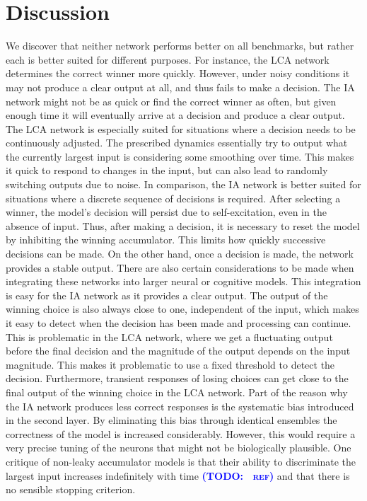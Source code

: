 \documentclass[10pt,letterpaper]{article}
\makeatletter
\newcommand{\todo}[1]{\textbf{\textsc{\textcolor{blue}{(TODO\@: #1)}}}}
\makeatother
\begin{document}
\section{Discussion}
We discover that neither network performs better on all benchmarks, but rather each is better suited for different purposes.
For instance, the LCA network determines the correct winner more quickly.
However, under noisy conditions it may not produce a clear output at all, and thus fails to make a decision.
The IA network might not be as quick or find the correct winner as often, but given enough time it will eventually arrive at a decision and produce a clear output.
The LCA network is especially suited for situations where a decision needs to be continuously adjusted.
The prescribed dynamics essentially try to output what the currently largest input is considering some smoothing over time.
This makes it quick to respond to changes in the input, but can also lead to randomly switching outputs due to noise.
In comparison, the IA network is better suited for situations where a discrete sequence of decisions is required.
After selecting a winner, the model's decision will persist due to self-excitation, even in the absence of input.
Thus, after making a decision, it is necessary to reset the model by inhibiting the winning accumulator.
This limits how quickly successive decisions can be made.
On the other hand, once a decision is made, the network provides a stable output.
There are also certain considerations to be made when integrating these networks into larger neural or cognitive models.
This integration is easy for the IA network as it provides a clear output.
The output of the winning choice is also always close to one, independent of the input, which makes it easy to detect when the decision has been made and processing can continue.
This is problematic in the LCA network, where we get a fluctuating output before the final decision and the magnitude of the output depends on the input magnitude.
This makes it problematic to use a fixed threshold to detect the decision.
Furthermore, transient responses of losing choices can get close to the final output of the winning choice in the LCA network.
Part of the reason why the IA network produces less correct responses is the systematic bias introduced in the second layer.
By eliminating this bias through identical ensembles the correctness of the model is increased considerably.
However, this would require a very precise tuning of the neurons that might not be biologically plausible.
One critique of non-leaky accumulator models is that their ability to discriminate the largest input increases indefinitely with time \todo{~ref} and that there is no sensible stopping criterion.
\end{document}
